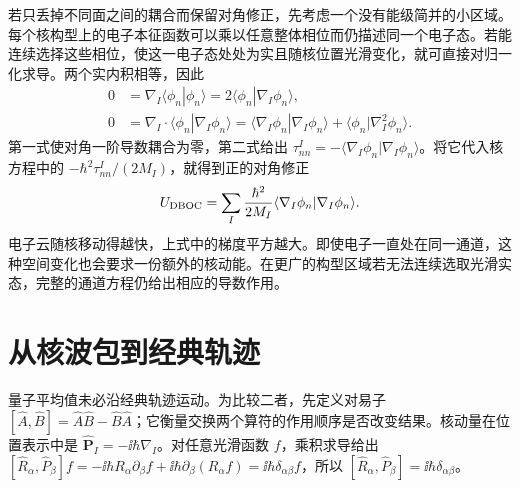 若只丢掉不同面之间的耦合而保留对角修正，先考虑一个没有能级简并的小区域。每个核构型上的电子本征函数可以乘以任意整体相位而仍描述同一个电子态。若能连续选择这些相位，使这一电子态处处为实且随核位置光滑变化，就可直接对归一化求导。两个实内积相等，因此
\begin{align}
0&=\nabla_I\langle\phi_n|\phi_n\rangle
=2\langle\phi_n|\nabla_I\phi_n\rangle,\\
0&=\nabla_I\cdot\langle\phi_n|\nabla_I\phi_n\rangle
=\langle\nabla_I\phi_n|\nabla_I\phi_n\rangle
+\langle\phi_n|\nabla_I^2\phi_n\rangle.
\end{align}
第一式使对角一阶导数耦合为零，第二式给出 $\tau_{nn}^I=-\langle\nabla_I\phi_n|\nabla_I\phi_n\rangle$。将它代入核方程中的 $-\hbar^2\tau_{nn}^I/(2M_I)$，就得到正的对角修正
\begin{equation}
U_{\rm DBOC}=\sum_I\frac{\hbar^2}{2M_I}\langle\nabla_I\phi_n|\nabla_I\phi_n\rangle.
\end{equation}
电子云随核移动得越快，上式中的梯度平方越大。即使电子一直处在同一通道，这种空间变化也会要求一份额外的核动能。在更广的构型区域若无法连续选取光滑实态，完整的通道方程仍给出相应的导数作用。

\section{从核波包到经典轨迹}
量子平均值未必沿经典轨迹运动。为比较二者，先定义对易子 $[\hat A,\hat B]=\hat A\hat B-\hat B\hat A$；它衡量交换两个算符的作用顺序是否改变结果。核动量在位置表示中是 $\hat{\bm P}_I=-\ii\hbar\nabla_I$。对任意光滑函数 $f$，乘积求导给出 $[\hat R_\alpha,\hat P_\beta]f=-\ii\hbar R_\alpha\partial_\beta f+\ii\hbar\partial_\beta(R_\alpha f)=\ii\hbar\delta_{\alpha\beta}f$，所以 $[\hat R_\alpha,\hat P_\beta]=\ii\hbar\delta_{\alpha\beta}$。

